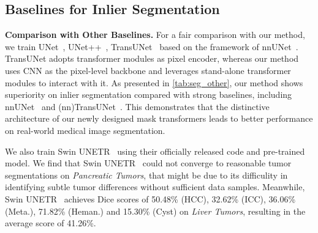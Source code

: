 \documentclass[10pt,twocolumn,letterpaper]{article}
\begin{document}
\subsection{Baselines for Inlier Segmentation}
\noindent\textbf{Comparison with Other Baselines.} For a fair comparison with our method, we train UNet~\cite{ronneberger2015u_unet0}, UNet++~\cite{zhou2019unet++_unet7}, TransUNet~\cite{chen2021transunet} based on the framework of nnUNet~\cite{isensee2021nnu}. TransUNet adopts transformer modules as pixel encoder, whereas our method uses CNN as the pixel-level backbone and leverages stand-alone transformer modules to interact with it. As presented in \cref{tab:seg_other}, our method shows superiority on inlier segmentation compared with strong baselines, including nnUNet~\cite{isensee2021nnu} and (nn)TransUNet~\cite{chen2021transunet}. This demonstrates that the distinctive architecture of our newly designed mask transformers leads to better performance on real-world medical image segmentation.

We also train Swin UNETR~\cite{tang2022self_swinunetr} using their officially released code and pre-trained model. We find that Swin UNETR~\cite{tang2022self_swinunetr} could not converge to reasonable tumor segmentations on \textit{Pancreatic Tumors}, that might be due to its difficulity in identifying subtle tumor differences without sufficient data samples. Meanwhile, Swin UNETR~\cite{tang2022self_swinunetr} achieves Dice scores of 50.48\% (HCC),   32.62\% (ICC), 36.06\% (Meta.), 71.82\% (Heman.) and 15.30\% (Cyst) on \textit{Liver Tumors}, resulting in the average score of 41.26\%.
\end{document}
